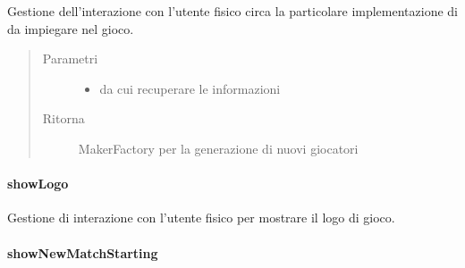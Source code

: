 \documentclass[letterpaper,10pt,italian,openany,oneside]{sphinxmanual}
\begin{document}
\begin{fulllineitems}
\label{\detokenize{source/it/unicam/cs/pa/mastermind/ui/StartView:it.unicam.cs.pa.mastermind.ui.StartView.setupMaker(MakerFactoryRegistry)}}
Gestione dell’interazione con l’utente fisico circa la particolare implementazione di  da impiegare nel gioco.
\begin{quote}\begin{description}
\item[{Parametri}] \leavevmode\begin{itemize}
\item {} 
 \textendash{} da cui recuperare le informazioni

\end{itemize}

\item[{Ritorna}] \leavevmode
MakerFactory per la generazione di nuovi giocatori 

\end{description}\end{quote}

\end{fulllineitems}



\paragraph{showLogo}
\label{\detokenize{source/it/unicam/cs/pa/mastermind/ui/StartView:showlogo}}

\begin{fulllineitems}
\label{\detokenize{source/it/unicam/cs/pa/mastermind/ui/StartView:it.unicam.cs.pa.mastermind.ui.StartView.showLogo()}}
Gestione di interazione con l’utente fisico per mostrare il logo di gioco.

\end{fulllineitems}



\paragraph{showNewMatchStarting}
\label{\detokenize{source/it/unicam/cs/pa/mastermind/ui/StartView:shownewmatchstarting}}
\end{document}
